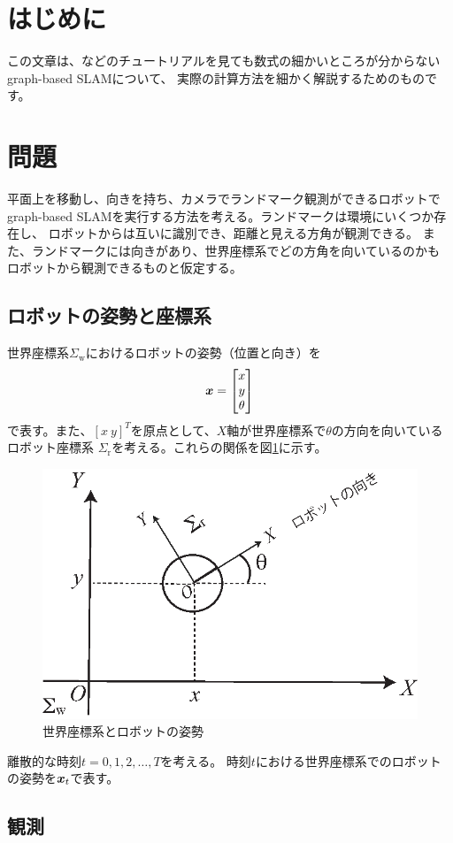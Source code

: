 \section{はじめに}

この文章は、\cite{grisetti2010}などのチュートリアルを見ても数式の細かいところが分からない
graph-based SLAMについて、
実際の計算方法を細かく解説するためのものです。

\section{問題}

平面上を移動し、向きを持ち、カメラでランドマーク観測ができるロボットで
graph-based SLAMを実行する方法を考える。ランドマークは環境にいくつか存在し、
ロボットからは互いに識別でき、距離と見える方角が観測できる。
また、ランドマークには向きがあり、世界座標系でどの方角を向いているのかも
ロボットから観測できるものと仮定する。

\subsection{ロボットの姿勢と座標系}

世界座標系$\Sigma_\text{w}$におけるロボットの姿勢（位置と向き）を
\begin{align}
	\boldsymbol{x} =
	\begin{bmatrix}
		x \\ y \\ \theta
	\end{bmatrix}
\end{align}
で表す。また、$[x\ y]^T$を原点として、$X$軸が世界座標系で$\theta$の方向を向いているロボット座標系
$\Sigma_\text{r}$を考える。これらの関係を図\ref{fig:coordinate}に示す。

\begin{figure}[htbp]
	\begin{center}
		\includegraphics[width=0.5\linewidth]{./figs/coordinate.eps}
		\caption{世界座標系とロボットの姿勢}
		\label{fig:coordinate}
	\end{center}
\end{figure}


離散的な時刻$t = 0,1,2,\dots,T$を考える。
時刻$t$における世界座標系でのロボットの姿勢を$\boldsymbol{x}_t$で表す。

\subsection{観測}

